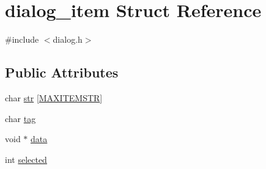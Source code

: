 \hypertarget{structdialog__item}{\section{dialog\-\_\-item Struct Reference}
\label{structdialog__item}
}


{\ttfamily \#include $<$dialog.\-h$>$}

\subsection*{Public Attributes}
\begin{DoxyCompactItemize}
\item 
char \hyperlink{structdialog__item_a55afa5c6bf6cf24ebed6f97e66e4ded5}{str} \mbox{[}\hyperlink{dialog_8h_aa18e7df53e0d521af814e7bcb746bf75}{M\-A\-X\-I\-T\-E\-M\-S\-T\-R}\mbox{]}
\item 
char \hyperlink{structdialog__item_a550d3c23b256d2e136aa275fa91419da}{tag}
\item 
void $\ast$ \hyperlink{structdialog__item_aee151fe91bcb5d1767d9df8877fd02c1}{data}
\item 
int \hyperlink{structdialog__item_ad765ac3f7715a975be0449dca146182e}{selected}
\end{DoxyCompactItemize}


